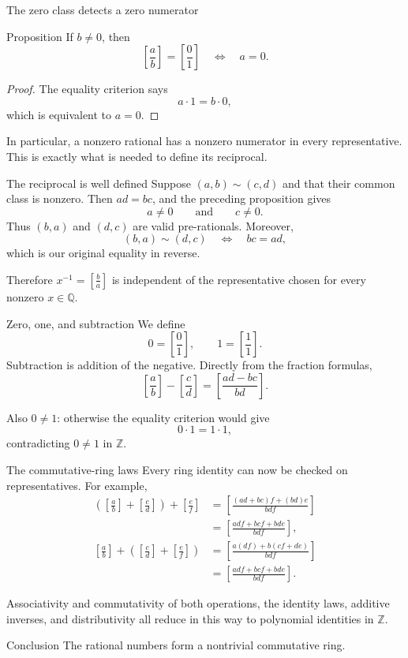 \documentclass[aspectratio=169,11pt]{beamer}
\newcommand{\Z}{\mathbb Z}
\newcommand{\Q}{\mathbb Q}
\newcommand{\qcl}[2]{\left[\frac{#1}{#2}\right]}
\begin{document}
\begin{frame}{The zero class detects a zero numerator}
  \begin{block}{Proposition}
    If \(b\ne0\), then
    \[
      \qcl ab=\qcl01
      \quad\Longleftrightarrow\quad a=0.
    \]
  \end{block}

  \begin{proof}
    The equality criterion says
    \[
      a\cdot1=b\cdot0,
    \]
    which is equivalent to \(a=0\).
  \end{proof}

  In particular, a nonzero rational has a nonzero numerator in every
  representative.  This is exactly what is needed to define its reciprocal.
\end{frame}

\begin{frame}{The reciprocal is well defined}
  Suppose \((a,b)\sim(c,d)\) and that their common class is nonzero.  Then
  \(ad=bc\), and the preceding proposition gives
  \[
    a\ne0
    \qquad\text{and}\qquad
    c\ne0.
  \]
  Thus \((b,a)\) and \((d,c)\) are valid pre-rationals.  Moreover,
  \[
    (b,a)\sim(d,c)
    \quad\Longleftrightarrow\quad
    bc=ad,
  \]
  which is our original equality in reverse.

  Therefore \(x^{-1}=\qcl ba\) is independent of the representative chosen
  for every nonzero \(x\in\Q\).
\end{frame}

\begin{frame}{Zero, one, and subtraction}
  We define
  \[
    0=\qcl01,
    \qquad
    1=\qcl11.
  \]
  Subtraction is addition of the negative.  Directly from the fraction
  formulas,
  \[
    \boxed{
      \qcl ab-\qcl cd=\qcl{ad-bc}{bd}.}
  \]

  Also \(0\ne1\): otherwise the equality criterion would give
  \[
    0\cdot1=1\cdot1,
  \]
  contradicting \(0\ne1\) in \(\Z\).
\end{frame}

\begin{frame}{The commutative-ring laws}
  \small
  Every ring identity can now be checked on representatives.  For example,
  \begin{align*}
    \left(\qcl ab+\qcl cd\right)+\qcl ef
      &=\qcl{(ad+bc)f+(bd)e}{bdf}\\
      &=\qcl{adf+bcf+bde}{bdf},\\[0.3em]
    \qcl ab+\left(\qcl cd+\qcl ef\right)
      &=\qcl{a(df)+b(cf+de)}{bdf}\\
      &=\qcl{adf+bcf+bde}{bdf}.
  \end{align*}

  Associativity and commutativity of both operations, the identity laws,
  additive inverses, and distributivity all reduce in this way to polynomial
  identities in \(\Z\).

  \begin{block}{Conclusion}
    The rational numbers form a nontrivial commutative ring.
  \end{block}
\end{frame}
\end{document}
